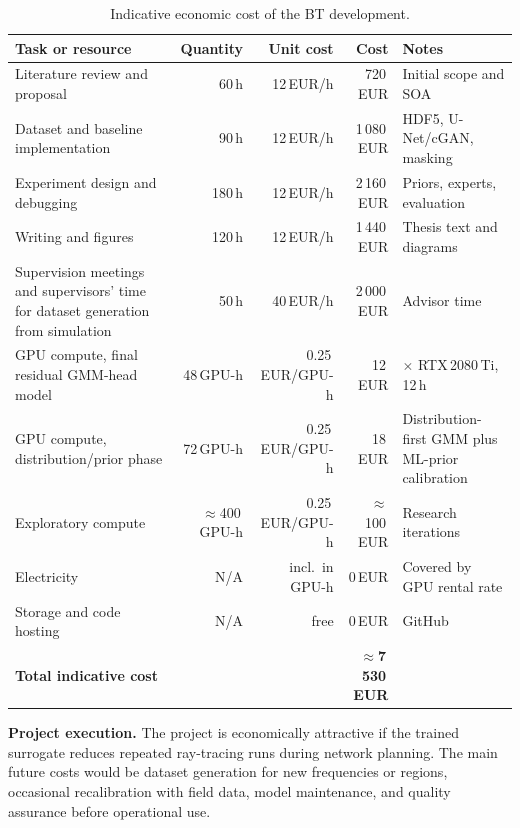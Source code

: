 \begin{table}[htbp]
\centering
\footnotesize
\renewcommand{\arraystretch}{1.1}
\caption{Indicative economic cost of the BT development.}
\label{tab:sustainability_budget}
\begin{tabularx}{\textwidth}{>{\raggedright\arraybackslash}Xrrr>{\raggedright\arraybackslash}p{3cm}}
\toprule
Task or resource & Quantity & Unit cost & Cost & Notes \\
\midrule
Literature review and proposal     & 60\,h         & 12\,EUR/h        &    720\,EUR & Initial scope and SOA \\
Dataset and baseline implementation & 90\,h        & 12\,EUR/h        & 1\,080\,EUR & HDF5, U-Net/cGAN, masking \\
Experiment design and debugging    & 180\,h        & 12\,EUR/h        & 2\,160\,EUR & Priors, experts, evaluation \\
Writing and figures                & 120\,h        & 12\,EUR/h        & 1\,440\,EUR & Thesis text and diagrams \\
Supervision meetings and supervisors' time for dataset generation from simulation & 50\,h         & 40\,EUR/h        & 2\,000\,EUR & Advisor time \\
GPU compute, final residual GMM-head model    & 48\,GPU-h     & 0.25\,EUR/GPU-h  &    12\,EUR  & 4$\times$ RTX\,2080\,Ti, 12\,h \\
GPU compute, distribution/prior phase & 72\,GPU-h  & 0.25\,EUR/GPU-h  &    18\,EUR  & Distribution-first GMM plus ML-prior calibration \\
Exploratory compute                & $\approx$400\,GPU-h & 0.25\,EUR/GPU-h & $\approx$100\,EUR & Research iterations \\
Electricity                        & N/A           & incl.\ in GPU-h  &     0\,EUR  & Covered by GPU rental rate \\
Storage and code hosting           & N/A           & free             &     0\,EUR  & GitHub \\
\midrule
\textbf{Total indicative cost}     &               &                  & \textbf{$\approx$7\,530\,EUR} & \\
\bottomrule
\end{tabularx}
\end{table}

\textbf{Project execution.} The project is economically attractive if the
trained surrogate reduces repeated ray-tracing runs during network planning.
The main future costs would be dataset generation for new frequencies or
regions, occasional recalibration with field data, model maintenance, and
quality assurance before operational use.

